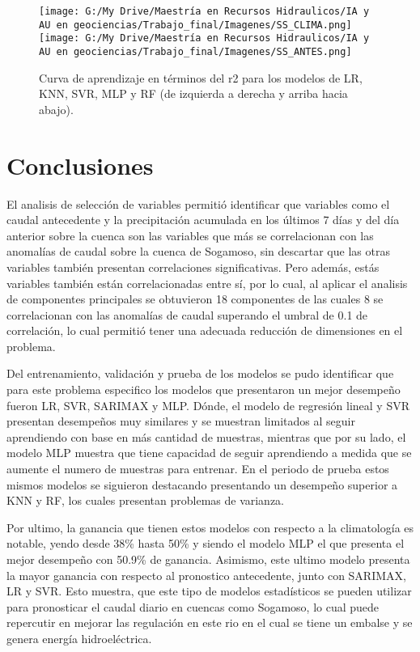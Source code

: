 \documentclass[draft]{agujournal2019}
\begin{document}
\begin{figure}[!]
	\centering%
	\texttt{[image: G:/My Drive/Maestría en Recursos Hidraulicos/IA y AU en geociencias/Trabajo\_final/Imagenes/SS\_CLIMA.png]}
	\texttt{[image: G:/My Drive/Maestría en Recursos Hidraulicos/IA y AU en geociencias/Trabajo\_final/Imagenes/SS\_ANTES.png]}
	\caption{Curva de aprendizaje en términos del r2 para los modelos de LR, KNN, SVR, MLP y RF (de izquierda a derecha y arriba hacia abajo).} \label{fig:SS}
\end{figure}


\section{Conclusiones}

El analisis de selección de variables permitió identificar que variables como el caudal antecedente y la precipitación acumulada en los últimos 7 días y del día anterior sobre la cuenca son las variables que más se correlacionan con las anomalías de caudal sobre la cuenca de Sogamoso, sin descartar que las otras variables también presentan correlaciones significativas. Pero además, estás variables también están correlacionadas entre sí, por lo cual, al aplicar el analisis de componentes principales se obtuvieron 18 componentes de las cuales 8 se correlacionan con las anomalías de caudal superando el umbral de 0.1 de correlación, lo cual permitió tener una adecuada reducción de dimensiones en el problema.

Del entrenamiento, validación y prueba de los modelos se pudo identificar que para este problema especifico los modelos que presentaron un mejor desempeño fueron LR, SVR, SARIMAX y MLP. Dónde, el modelo de regresión lineal y SVR presentan desempeños muy similares y se muestran limitados al seguir aprendiendo con base en más cantidad de muestras, mientras que por su lado, el modelo MLP muestra que tiene capacidad de seguir aprendiendo a medida que se aumente el numero de muestras para entrenar. En el periodo de prueba estos mismos modelos se siguieron destacando presentando un desempeño superior a KNN y RF, los cuales presentan problemas de varianza.

Por ultimo, la ganancia que tienen estos modelos con respecto a la climatología es notable, yendo desde 38\% hasta 50\% y siendo el modelo MLP el que presenta el mejor desempeño con 50.9\% de ganancia. Asimismo, este ultimo modelo presenta la mayor ganancia con respecto al pronostico antecedente, junto con SARIMAX, LR y SVR. Esto muestra, que este tipo de modelos estadísticos se pueden utilizar para pronosticar el caudal diario en cuencas como Sogamoso, lo cual puede repercutir en mejorar las regulación en este rio en el cual se tiene un embalse y se genera energía hidroeléctrica.
\end{document}
